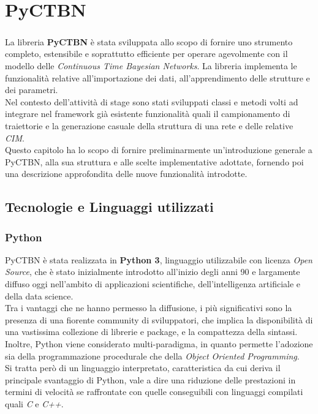 \chapter{PyCTBN}
  \label{chapter_pyctbn}
  \paragraph{}
  La libreria \textbf{PyCTBN} è stata sviluppata allo scopo di fornire uno strumento completo,
  estensibile e soprattutto efficiente per operare agevolmente con il modello delle
  \textit{Continuous Time Bayesian Networks}. La libreria implementa le funzionalità
  relative all'importazione dei dati, all'apprendimento delle strutture e dei
  parametri.\\
  Nel contesto dell'attività di stage sono stati sviluppati classi e metodi volti ad
  integrare nel framework già esistente funzionalità quali il campionamento di traiettorie e la 
  generazione casuale della struttura di una rete e delle relative \textit{CIM}.\\
  Questo capitolo ha lo scopo di fornire preliminarmente un'introduzione generale a PyCTBN, alla sua
  struttura e alle scelte implementative adottate, fornendo poi una descrizione approfondita
  delle nuove funzionalità introdotte.

  \section{Tecnologie e Linguaggi utilizzati}
  \subsection{Python}
  PyCTBN è stata realizzata in \textbf{Python 3}, linguaggio utilizzabile con licenza
  \textit{Open Source}, che è stato inizialmente introdotto all'inizio degli anni 90 e 
  largamente diffuso oggi nell'ambito di applicazioni scientifiche, dell'intelligenza artificiale e della data science.\\
  Tra i vantaggi che ne hanno permesso la diffusione, i più significativi sono la
  presenza di una fiorente community di sviluppatori, che implica la disponibilità di una
  vastissima collezione di librerie e package, e la compattezza della sintassi.\\
  Inoltre, Python viene considerato multi-paradigma, in quanto permette l'adozione
  sia della programmazione procedurale che della \textit{Object Oriented Programming}.\\
  Si tratta però di un linguaggio interpretato, caratteristica da cui deriva il principale 
  svantaggio di Python, vale a dire una riduzione delle prestazioni in termini di velocità
  se raffrontate con quelle conseguibili con linguaggi compilati quali \textit{C} e \textit{C++}.


